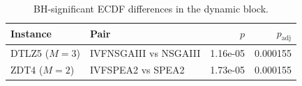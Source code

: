 \begin{table}[t]
\centering
\caption{BH-significant ECDF differences in the dynamic block.}
\label{tab:ecdf_bh}
\scriptsize
\begin{tabular}{llrr}
\toprule
Instance & Pair & $p$ & $p_{\mathrm{adj}}$ \\
\midrule
DTLZ5 ($M=3$) & IVFNSGAIII vs NSGAIII & 1.16e-05 & 0.000155 \\
ZDT4 ($M=2$) & IVFSPEA2 vs SPEA2 & 1.73e-05 & 0.000155 \\
\bottomrule
\end{tabular}
\end{table}
